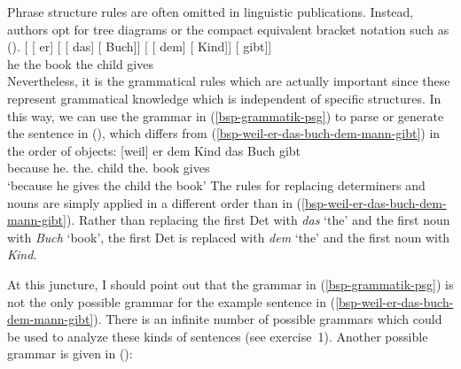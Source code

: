 Phrase structure rules are often omitted in linguistic publications. Instead, authors opt for tree diagrams or the compact equivalent bracket notation
such as ().
\ea
\gll {}[ [ er] [ [ das] [ Buch]]  [ [ dem] [ Kind]] [ gibt]]\\
     {}         {}        he  {}        {}       the  {}       book    {}        {}       the  {}       child     {}      gives\\  
\z
Nevertheless, it is the grammatical rules which are actually important since these represent grammatical knowledge which is independent of specific structures.
In this way, we can use the grammar in (\ref{bsp-grammatik-psg}) to parse or generate the sentence
in (), which differs from (\ref{bsp-weil-er-das-buch-dem-mann-gibt}) in the order of objects: 
\ea
\gll {}[weil] er dem Kind das Buch gibt\\
	 {}\spacebr{}because he.\NOM{} the.\DAT{} child the.\ACC{} book gives\\
\glt `because he gives the child the book'
\z
The rules for replacing determiners and nouns are simply applied in a different order than in (\ref{bsp-weil-er-das-buch-dem-mann-gibt}). Rather than replacing the first Det with \emph{das} `the' and the first noun with \emph{Buch} `book', the first Det is replaced with \emph{dem} `the' and the first noun with \emph{Kind}.

At this juncture, I should point out that the grammar in (\ref{bsp-grammatik-psg}) is not the only possible grammar for the example sentence in
(\ref{bsp-weil-er-das-buch-dem-mann-gibt}). There is an infinite\label{page-unendlich-viele-grammatiken} number of possible grammars which could
be used to analyze these kinds of sentences (see  exercise~1). Another possible grammar is given in ():

